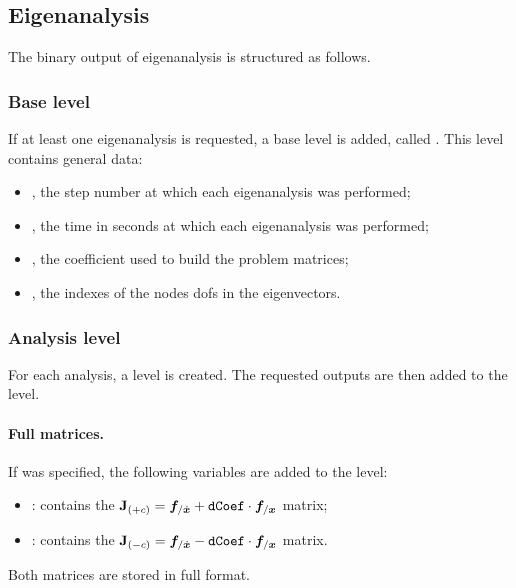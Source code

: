 \subsection{Eigenanalysis}
\label{sec:NetCDF:Eigen}
The binary output of eigenanalysis is structured as follows.
\subsubsection{Base level}
If at least one eigenanalysis is requested, a base level is added, called .
This level contains general data:
\begin{itemize}
\item {}, the step number at which each eigenanalysis was performed;
\item {}, the time in seconds at which each eigenanalysis was performed;
\item {}, the coefficient used to build the problem matrices;
\item {}, the indexes of the nodes dofs in the eigenvectors.
\end{itemize}

\subsubsection{Analysis level}
For each analysis, a level  is created. The requested outputs 
are then added to the level.

\paragraph{Full matrices.}
If  was specified, the following variables are added to the
 level:
\begin{itemize}
\item {} : contains the 
    $\bm{\mathbf J}_{(+c)} = \boldsymbol{f}_{/\dot{\boldsymbol{x}}} + \texttt{dCoef} \cdot \boldsymbol{f}_{/\boldsymbol{x}}$ 
    matrix;
\item {} : contains the
    $\bm{\mathbf J}_{(-c)} = \boldsymbol{f}_{/\dot{\boldsymbol{x}}} - \texttt{dCoef} \cdot \boldsymbol{f}_{/\boldsymbol{x}}$ 
    matrix.
\end{itemize}
Both matrices are stored in full format.


